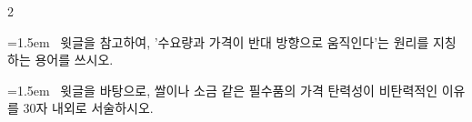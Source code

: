 \documentclass[10pt, a4paper]{article}
\begin{document}
\begin{multicols}{2}
\noindent\begin{minipage}{\columnwidth}
\vspace{2mm}
{\hangindent=1.5em  ~윗글을 참고하여, '수요량과 가격이 반대 방향으로 움직인다'는 원리를 지칭하는 용어를 쓰시오.\par}

\vspace{3mm}
\noindent\hrulefill
\vspace{2.5mm}
\noindent\hrulefill
\vspace{2.5mm}
\noindent\hrulefill
\vspace{2.5mm}
\noindent\hrulefill
\vspace{2.5mm}
\noindent\hrulefill
\vspace{2.5mm}
\vspace{1mm}
\vspace{4mm}
\end{minipage}
\par

\noindent\begin{minipage}{\columnwidth}
\vspace{2mm}
{\hangindent=1.5em  ~윗글을 바탕으로, 쌀이나 소금 같은 필수품의 가격 탄력성이 비탄력적인 이유를 30자 내외로 서술하시오.\par}

\vspace{3mm}
\noindent\hrulefill
\vspace{2.5mm}
\noindent\hrulefill
\vspace{2.5mm}
\noindent\hrulefill
\vspace{2.5mm}
\noindent\hrulefill
\vspace{2.5mm}
\noindent\hrulefill
\vspace{2.5mm}
\vspace{1mm}
\vspace{4mm}
\end{minipage}
\par


\vspace{1mm}
\vspace{0.5mm}


\end{multicols}
\end{document}
